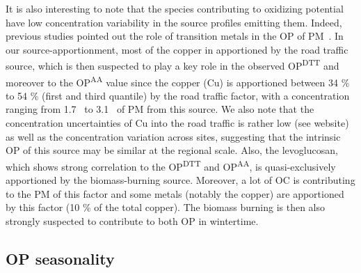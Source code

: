 \documentclass[acp]{copernicus}
\begin{document}
It is also interesting to note that the species contributing to
oxidizing potential have low concentration variability in the source
profiles emitting them. Indeed, previous studies pointed out the role of
transition metals in the OP of
PM~\citep{calasComparison2018,vermaOrganic2015,borlazaOxidative2018}.
In our source-apportionment, most of the copper in apportioned
by the road traffic source, which is then suspected to play a key role
in the observed OP\textsuperscript{DTT} and moreover to the
OP\textsuperscript{AA} value since the copper (Cu) is apportioned
between 34 \% to 54 \% (first and third quantile) by the road traffic
factor, with a concentration ranging from 1.7~ to 3.1~ of PM from this
source. We also note that the concentration uncertainties of Cu into the
road traffic is rather low (see website) as well as the concentration
variation across sites, suggesting that the intrinsic OP of this source
may be similar at the regional scale. Also, the levoglucosan, which
shows strong correlation to the OP\textsuperscript{DTT} and
OP\textsuperscript{AA}, is quasi-exclusively apportioned by the
biomass-burning source. Moreover, a lot of OC is contributing to the PM
of this factor and some metals (notably the copper) are apportioned by
this factor (10 \% of the total copper). The biomass burning is then
also strongly suspected to contribute to both OP in wintertime.

\subsection{OP seasonality}%
\label{op-seasonality}
\end{document}

